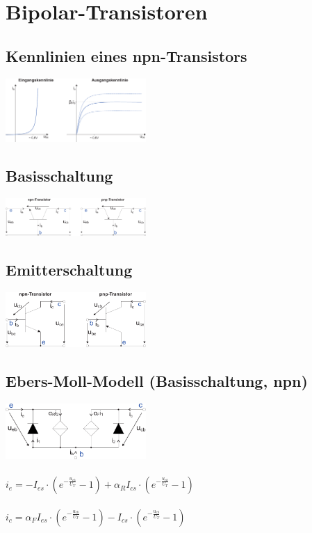 \documentclass[a4paper,twocolumn,10pt]{article}
\begin{document}
\section*{Bipolar-Transistoren}
\subsection*{Kennlinien eines npn-Transistors}
\includegraphics[width=0.4\textwidth]{Grafiken/Kennlinie_Transistor}
\subsection*{Basisschaltung}
\includegraphics[width=0.4\textwidth]{Grafiken/Transistor_Basisschaltung}
\subsection*{Emitterschaltung}
\includegraphics[width=0.4\textwidth]{Grafiken/Transistor_Emitterschaltung}

\subsection*{Ebers-Moll-Modell (Basisschaltung, npn)}
\includegraphics[width=0.4\textwidth]{Grafiken/Ebers-Moll}\\\\
$i_e=-I_{es}\cdot (e^{-\frac{u_{eb}}{U_T}}-1)+\alpha_RI_{cs}\cdot (e^{-\frac{u_{cb}}{U_T}}-1)$\\\\
$i_c=\alpha_FI_{es}\cdot (e^{-\frac{u_{eb}}{U_T}}-1)-I_{cs}\cdot (e^{-\frac{u_{cb}}{U_T}}-1)$
\end{document}
